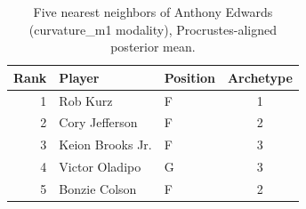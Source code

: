 \begin{table}[htbp]
  \centering\small
  \begin{tabular}{rllc}
    \toprule
    Rank & Player & Position & Archetype \\
    \midrule
    1 & Rob Kurz & F & 1 \\
    2 & Cory Jefferson & F & 2 \\
    3 & Keion Brooks Jr. & F & 3 \\
    4 & Victor Oladipo & G & 3 \\
    5 & Bonzie Colson & F & 2 \\
    \bottomrule
  \end{tabular}
  \caption{Five nearest neighbors of Anthony Edwards (curvature_m1 modality), Procrustes-aligned posterior mean.}
  \label{tab:Anthony_Edwards_neighbors_curvature_m1}
\end{table}

